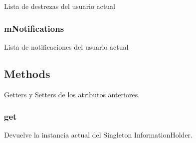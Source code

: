 \documentclass[letterpaper,10pt,english]{sphinxmanual}
\begin{document}
\begin{fulllineitems}
\label{Singletons/InformationHolder:com.fiuba.tallerii.jobify.InformationHolder.mSkills}
Lista de destrezas del usuario actual

\end{fulllineitems}



\subsubsection{mNotifications}
\label{Singletons/InformationHolder:mnotifications}

\begin{fulllineitems}
\label{Singletons/InformationHolder:com.fiuba.tallerii.jobify.InformationHolder.mNotifications}
Lista de notificaciones del usuario actual

\end{fulllineitems}



\subsection{Methods}
\label{Singletons/InformationHolder:methods}
Getters y Setters de los atributos anteriores.


\subsubsection{get}
\label{Singletons/InformationHolder:get}

\begin{fulllineitems}
\label{Singletons/InformationHolder:com.fiuba.tallerii.jobify.InformationHolder.get()}
Devuelve la instancia actual del Singleton InformationHolder.

\end{fulllineitems}
\end{document}
